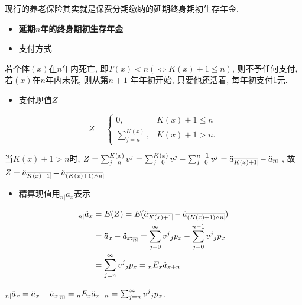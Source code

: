 \documentclass[a4paper,10pt]{ctexbook}
\makeatletter
\newcommand{\hei}{\CJKfamily{hei}}      %
\DeclareRobustCommand{\annu}[1]{_{%
    \def\arraystretch{0}%
    \setlength\arraycolsep{1pt}%
    \setlength\arrayrulewidth{.2pt}%
    \begin{array}[b]{@{}c|}\hline
        \\[\arraycolsep]%
        \scriptstyle #1%
    \end{array}%
}}
\makeatother
\begin{document}
\begin{remark}
    现行的养老保险其实就是保费分期缴纳的延期终身期初生存年金.
\end{remark}

\begin{itemize}
    \item[{\bf\hei 四.}]{\bf\hei 延期$n$年的终身期初生存年金}
\end{itemize}

\begin{itemize}
    \item[{\bf\hei 1.}] 支付方式
\end{itemize}

若个体$(x)$在$n$年内死亡, 即$T(x)<n(\iff K(x)+1\leq n)$, 则不予任何支付, 若$(x)$在$n$年内未死, 则从第$n+1$ 年年初开始, 只要他还活着, 每年初支付1元.

\begin{itemize}
    \item[{\bf\hei2.}] 支付现值$Z$
\end{itemize}
$$Z =
    \begin{cases}
        0,                 & K(x)+1\leq n \\
        \sum^{K(x)}_{j=n}, & K(x)+1>n.
    \end{cases}
$$

当$K(x)+1>n$时, $Z=\sum^{K(x)}_{j=n}v^{j}=\sum^{K(x)}_{j=0}v^{j}-\sum^{n-1}_{j=0}v^{j}=\ddot a\annu{K(x)+1}-\ddot a\annu n$ , 故$Z=\ddot a\annu{K(x)+1}-\ddot a\annu{(K(x)+1)\land n}$

\begin{itemize}
    \item[{\bf\hei3.}] 精算现值用$_{n|}\ddot a_{x}$表示
\end{itemize}
\begin{align*}
    _{n|}\ddot a_{x} & =E(Z)=E(\ddot a\annu{K(x)+1}-\ddot a\annu{(K(x)+1)\land n})                                           \\
                     & =\ddot a_{x}-\ddot a_{x:\annu n}=\sum^{\infty}_{j=0}v^{j}{}_{j}p_{x}-\sum^{n-1}_{j=0}v^{j}{}_{j}p_{x} \\
                     & =\sum^{\infty}_{j=n}v^{j}{}_{j}p_{x} ={}_{n}E_{x}\ddot a_{x+n}
\end{align*}

\begin{remark}
    $_{n|}\ddot a_{x}=\ddot a_{x}-\ddot a_{x:\annu n}={}_{n}E_{x}\ddot a_{x+n}=\sum^{\infty}_{j=n}v^{j}{}_{j}p_{x}$.
\end{remark}
\end{document}
